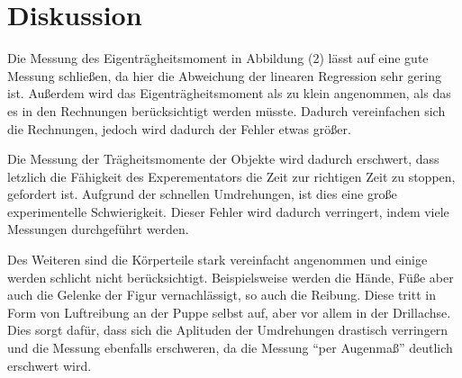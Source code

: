 \section{Diskussion}
\label{sec:Diskussion}

Die Messung des Eigenträgheitsmoment in Abbildung (2) lässt auf eine gute Messung schließen,
da hier die Abweichung der linearen Regression sehr gering ist.
Außerdem wird das Eigenträgheitsmoment als zu klein angenommen, als das es in den Rechnungen berücksichtigt werden müsste.
Dadurch vereinfachen sich die Rechnungen, jedoch wird dadurch der Fehler etwas größer.

Die Messung der Trägheitsmomente der Objekte wird dadurch erschwert, dass letzlich die Fähigkeit des Experementators die Zeit zur 
richtigen Zeit zu stoppen, gefordert ist.
Aufgrund der schnellen Umdrehungen, ist dies eine große experimentelle Schwierigkeit.
Dieser Fehler wird dadurch verringert, indem viele Messungen durchgeführt werden.

Des Weiteren sind die Körperteile stark vereinfacht angenommen und einige werden schlicht nicht berücksichtigt.
Beispielsweise werden die Hände, Füße aber auch die Gelenke der Figur vernachlässigt, so auch die Reibung.
Diese tritt in Form von Luftreibung an der Puppe selbst auf, aber vor allem in der Drillachse.
Dies sorgt dafür, dass sich die Aplituden der Umdrehungen drastisch verringern und die Messung ebenfalls erschweren, da die
Messung \enquote{per Augenmaß} deutlich erschwert wird.

\nocite{matplotlib}
\nocite{numpy}